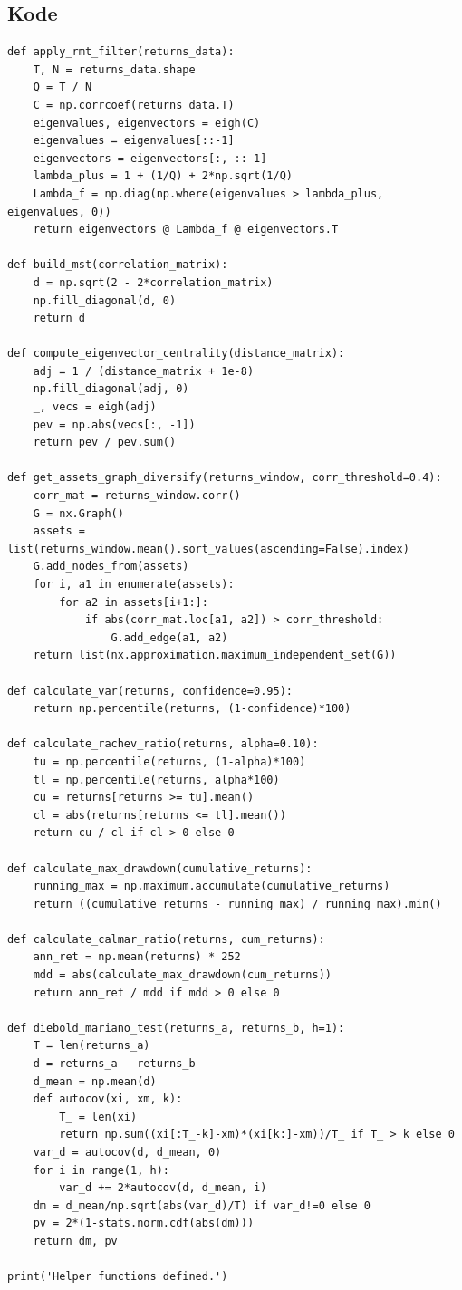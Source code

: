 \documentclass[12pt,a4paper]{article}
\begin{document}
\subsection{Kode}
\begin{lstlisting}[caption={Helper functions dan metrik risiko}]
def apply_rmt_filter(returns_data):
    T, N = returns_data.shape
    Q = T / N
    C = np.corrcoef(returns_data.T)
    eigenvalues, eigenvectors = eigh(C)
    eigenvalues = eigenvalues[::-1]
    eigenvectors = eigenvectors[:, ::-1]
    lambda_plus = 1 + (1/Q) + 2*np.sqrt(1/Q)
    Lambda_f = np.diag(np.where(eigenvalues > lambda_plus, eigenvalues, 0))
    return eigenvectors @ Lambda_f @ eigenvectors.T

def build_mst(correlation_matrix):
    d = np.sqrt(2 - 2*correlation_matrix)
    np.fill_diagonal(d, 0)
    return d

def compute_eigenvector_centrality(distance_matrix):
    adj = 1 / (distance_matrix + 1e-8)
    np.fill_diagonal(adj, 0)
    _, vecs = eigh(adj)
    pev = np.abs(vecs[:, -1])
    return pev / pev.sum()

def get_assets_graph_diversify(returns_window, corr_threshold=0.4):
    corr_mat = returns_window.corr()
    G = nx.Graph()
    assets = list(returns_window.mean().sort_values(ascending=False).index)
    G.add_nodes_from(assets)
    for i, a1 in enumerate(assets):
        for a2 in assets[i+1:]:
            if abs(corr_mat.loc[a1, a2]) > corr_threshold:
                G.add_edge(a1, a2)
    return list(nx.approximation.maximum_independent_set(G))

def calculate_var(returns, confidence=0.95):
    return np.percentile(returns, (1-confidence)*100)

def calculate_rachev_ratio(returns, alpha=0.10):
    tu = np.percentile(returns, (1-alpha)*100)
    tl = np.percentile(returns, alpha*100)
    cu = returns[returns >= tu].mean()
    cl = abs(returns[returns <= tl].mean())
    return cu / cl if cl > 0 else 0

def calculate_max_drawdown(cumulative_returns):
    running_max = np.maximum.accumulate(cumulative_returns)
    return ((cumulative_returns - running_max) / running_max).min()

def calculate_calmar_ratio(returns, cum_returns):
    ann_ret = np.mean(returns) * 252
    mdd = abs(calculate_max_drawdown(cum_returns))
    return ann_ret / mdd if mdd > 0 else 0

def diebold_mariano_test(returns_a, returns_b, h=1):
    T = len(returns_a)
    d = returns_a - returns_b
    d_mean = np.mean(d)
    def autocov(xi, xm, k):
        T_ = len(xi)
        return np.sum((xi[:T_-k]-xm)*(xi[k:]-xm))/T_ if T_ > k else 0
    var_d = autocov(d, d_mean, 0)
    for i in range(1, h):
        var_d += 2*autocov(d, d_mean, i)
    dm = d_mean/np.sqrt(abs(var_d)/T) if var_d!=0 else 0
    pv = 2*(1-stats.norm.cdf(abs(dm)))
    return dm, pv

print('Helper functions defined.')
\end{lstlisting}
\end{document}
